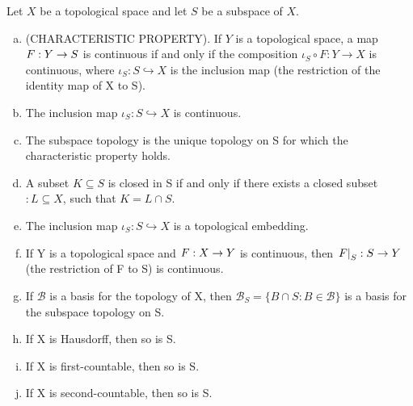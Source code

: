 \documentclass[11pt,a4paper]{article}
\begin{document}
\begin{prop}
Let $X$ be a topological space and let $S$ be a subspace of $X$.
\begin{enumerate}[(a)]
    \item (CHARACTERISTIC PROPERTY). If $Y$ is a topological space, a map $F:Y\rightarrow S$ is continuous if and only if the composition $\iota_S\circ F: Y\rightarrow X$ is continuous, where $\iota_S:S\hookrightarrow X$ is the inclusion map (the restriction of the identity map of X to S).
    \item The inclusion map $\iota_S:S\hookrightarrow X$ is continuous.
    \item The subspace topology is the unique topology on S for which the characteristic property holds.
    \item A subset $K\subseteq S$ is closed in S if and only if there exists a closed subset $:L\subseteq X$, such that $K=L\cap S$.
    \item The inclusion map $\iota_S:S\hookrightarrow X$ is a topological embedding.
    \item If Y is a topological space and $F:X\rightarrow Y$ is continuous, then $\left.F\right|_{S}:S\rightarrow Y$ (the restriction of F to S) is continuous.
    \item If $\mathcal{B}$ is a basis for the topology of X, then $\mathcal{B}_S = \{B\cap S: B\in\mathcal{B}\}$ is a basis for the subspace topology on S.
    \item If X is Hausdorff, then so is S.
    \item If X is first-countable, then so is S.
    \item If X is second-countable, then so is S. 
\end{enumerate}
\end{prop}
\end{document}
